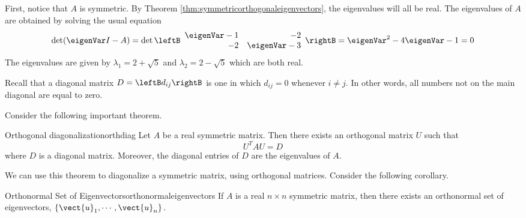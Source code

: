 \begin{solution}
First, notice that $A$ is symmetric. By Theorem \ref{thm:symmetricorthogonaleigenvectors}, the eigenvalues will all be real. The eigenvalues of $A$ are obtained by solving the usual equation 
\[
\det (\eigenVar I - A) = 
\det \leftB
\begin{array}{rr}
\eigenVar - 1 & -2 \\ 
-2 & \eigenVar - 3 
\end{array}
\rightB = \eigenVar^2 -4\eigenVar -1=0
\]
The eigenvalues are given by $\lambda_1 =2+
\sqrt{5}$ and $\lambda_2 =2-\sqrt{5}$ which are both real. 
\end{solution}

Recall that a diagonal matrix $D=\leftB d_{ij} \rightB$ is one in which $d_{ij} = 0$ whenever $i \neq j$. In other words, all numbers not on the main diagonal are equal to zero. 

Consider the following important theorem.

\begin{theorem}{Orthogonal diagonalization}{orthdiag}
Let $A$ be a real symmetric matrix. Then there exists an
orthogonal matrix $U$ such that 
\[
U^{T}AU = D
\]
where $D$ is a diagonal matrix. Moreover,
the diagonal entries of $D$ are the eigenvalues of $A$.
\end{theorem}

We can use this theorem to diagonalize a symmetric matrix, using orthogonal matrices. Consider the following corollary.

\begin{corollary}{Orthonormal Set of Eigenvectors}{orthonormaleigenvectors}
If $A$ is a real $n\times n$ symmetric matrix, then there exists an
orthonormal set of eigenvectors, $\left\{ \vect{u}_{1},\cdots ,\vect{u}
_{n}\right\} .$
\end{corollary}

